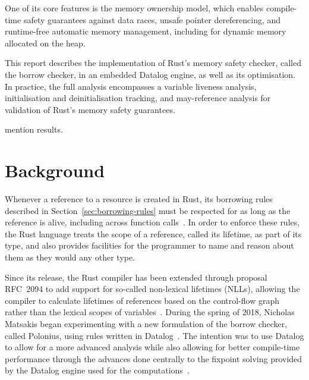 \documentclass[11pt,a4paper,twoside,openany]{report}
\newcommand{\fixme}[1] {{\color{red}#1}}
\begin{document}
One of its core features is the memory ownership model, which enables
compile-time safety guarantees against data races, unsafe pointer dereferencing,
and runtime-free automatic memory management, including for dynamic memory
allocated on the heap.

This report describes the implementation of Rust's memory safety checker, called
the borrow checker, in an embedded Datalog engine, as well as its optimisation.
In practice, the full analysis encompasses a variable liveness analysis,
initialisation and deinitialisation tracking, and may-reference analysis for
validation of Rust's memory safety guarantees.

\fixme{mention results.}

\chapter{Background}
Whenever a reference to a resource is created in Rust, its borrowing rules
described in Section~\ref{sec:borrowing-rules} must be respected for as long as
the reference is alive, including across function
calls~\cite{nichols_rust_nodate}. In order to enforce these rules, the Rust
language treats the scope of a reference, called its lifetime, as part of its
type, and also provides facilities for the programmer to name and reason about
them as they would any other type.


Since its release, the Rust compiler has been extended through proposal RFC~2094
to add support for so-called non-lexical lifetimes (NLLs), allowing the compiler
to calculate lifetimes of references based on the control-flow graph rather than
the lexical scopes of variables~\cite{noauthor_rfc_2019}. During the spring of
2018, Nicholas Matsakis began experimenting with a new formulation of the borrow
checker, called Polonius, using rules written in
Datalog~\cite{matsakis_alias-based_2018}. The intention was to use Datalog to
allow for a more advanced analysis while also allowing for better compile-time
performance through the advances done centrally to the fixpoint solving provided
by the Datalog engine used for the computations~\cite{datafrog}.
\end{document}
